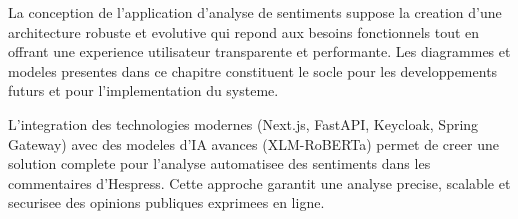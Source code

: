 La conception de l'application d'analyse de sentiments suppose la creation d'une architecture robuste et evolutive qui repond aux besoins fonctionnels tout en offrant une experience utilisateur transparente et performante. Les diagrammes et modeles presentes dans ce chapitre constituent le socle pour les developpements futurs et pour l'implementation du systeme.

L'integration des technologies modernes (Next.js, FastAPI, Keycloak, Spring Gateway) avec des modeles d'IA avances (XLM-RoBERTa) permet de creer une solution complete pour l'analyse automatisee des sentiments dans les commentaires d'Hespress. Cette approche garantit une analyse precise, scalable et securisee des opinions publiques exprimees en ligne.

